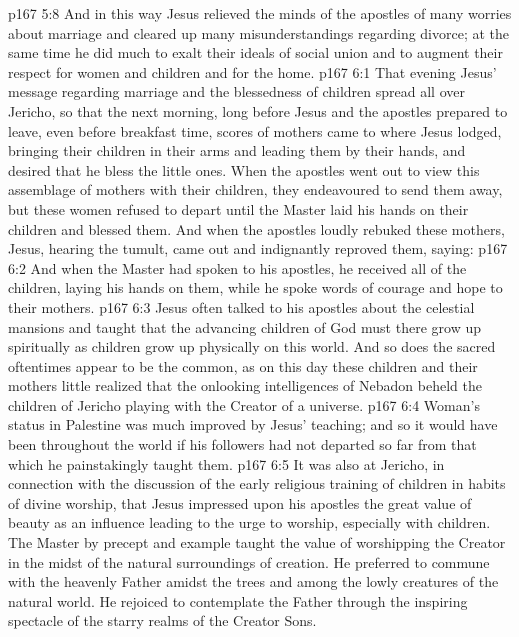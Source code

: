 \vs p167 5:8 And in this way Jesus relieved the minds of the apostles of many worries about marriage and cleared up many misunderstandings regarding divorce; at the same time he did much to exalt their ideals of social union and to augment their respect for women and children and for the home.
\vs p167 6:1 That evening Jesus’ message regarding marriage and the blessedness of children spread all over Jericho, so that the next morning, long before Jesus and the apostles prepared to leave, even before breakfast time, scores of mothers came to where Jesus lodged, bringing their children in their arms and leading them by their hands, and desired that he bless the little ones. When the apostles went out to view this assemblage of mothers with their children, they endeavoured to send them away, but these women refused to depart until the Master laid his hands on their children and blessed them. And when the apostles loudly rebuked these mothers, Jesus, hearing the tumult, came out and indignantly reproved them, saying: 
\vs p167 6:2 And when the Master had spoken to his apostles, he received all of the children, laying his hands on them, while he spoke words of courage and hope to their mothers.
\vs p167 6:3 \pc Jesus often talked to his apostles about the celestial mansions and taught that the advancing children of God must there grow up spiritually as children grow up physically on this world. And so does the sacred oftentimes appear to be the common, as on this day these children and their mothers little realized that the onlooking intelligences of Nebadon beheld the children of Jericho playing with the Creator of a universe.
\vs p167 6:4 \pc Woman’s status in Palestine was much improved by Jesus’ teaching; and so it would have been throughout the world if his followers had not departed so far from that which he painstakingly taught them.
\vs p167 6:5 \pc It was also at Jericho, in connection with the discussion of the early religious training of children in habits of divine worship, that Jesus impressed upon his apostles the great value of beauty as an influence leading to the urge to worship, especially with children. The Master by precept and example taught the value of worshipping the Creator in the midst of the natural surroundings of creation. He preferred to commune with the heavenly Father amidst the trees and among the lowly creatures of the natural world. He rejoiced to contemplate the Father through the inspiring spectacle of the starry realms of the Creator Sons.
